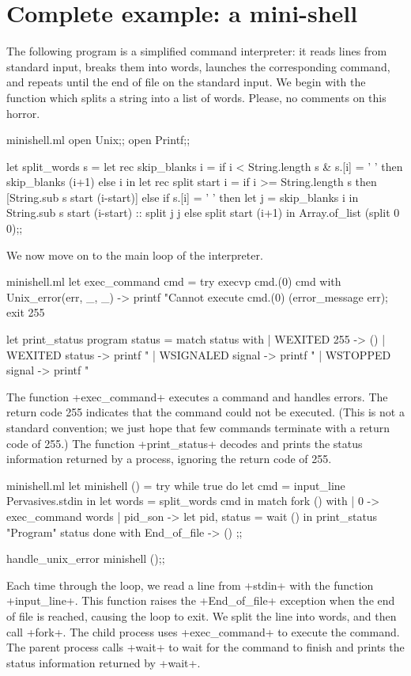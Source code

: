 \section{Complete example: a mini-shell}

The following program is a simplified command interpreter: it reads
lines from standard input, breaks them into words, launches the
corresponding command, and repeats until the end of file on the
standard input.  We begin with the function which splits a string into
a list of words.  Please, no comments on this horror.

\begin{listingcodefile}{minishell.ml}
open Unix;;
open Printf;;

let split_words s =
 let rec skip_blanks i =
   if i < String.length s & s.[i] = ' '
   then skip_blanks (i+1)
   else i in
 let rec split start i =
   if i >= String.length s then
     [String.sub s start (i-start)]
   else if s.[i] = ' ' then
     let j = skip_blanks i in
     String.sub s start (i-start) :: split j j
   else
     split start (i+1) in
 Array.of_list (split 0 0);;
\end{listingcodefile}
%
We now move on to the main loop of the interpreter.
%
\begin{listingcodefile}{minishell.ml}
let exec_command cmd =
 try execvp cmd.(0) cmd
 with Unix_error(err, _, _) ->
   printf "Cannot execute %
     cmd.(0) (error_message err);
   exit 255

let print_status program status =
 match status with
 | WEXITED 255 -> ()
 | WEXITED status ->
     printf "%
 | WSIGNALED signal ->
     printf "%
 | WSTOPPED signal ->
     printf "%
\end{listingcodefile}
%
The function \ml+exec_command+ executes a command and handles errors.
The return code 255 indicates that the command could not be executed.
(This is not a standard convention; we just hope that few commands
terminate with a return code of 255.)  The function
\ml+print_status+ decodes and prints the status information returned
by a process, ignoring the return code of 255.
%
\begin{listingcodefile}{minishell.ml}
let minishell () =
 try
   while true do
     let cmd = input_line Pervasives.stdin in
     let words = split_words cmd in
     match fork () with
     | 0 -> exec_command words
     | pid_son ->
         let pid, status = wait () in
         print_status "Program" status
   done
 with End_of_file -> ()
;;

handle_unix_error minishell ();;
\end{listingcodefile}
% 
Each time through the loop, we read a line from \ml+stdin+ with the
function \ml+input_line+.  This function raises the \ml+End_of_file+
exception when the end of file is reached, causing the loop to
exit. We split the line into words, and then call \ml+fork+.  The
child process uses \ml+exec_command+ to execute the command.  The
parent process calls \ml+wait+ to wait for the command to finish and
prints the status information returned by \ml+wait+.

